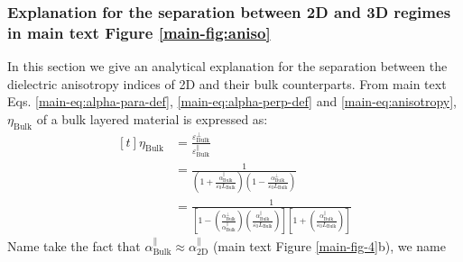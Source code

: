 \documentclass[manuscript=suppinfo,email=true,hyperref=true,keywords=false]{achemso}
\begin{document}
\subsubsection{Explanation for the separation between 2D and 3D regimes in main text Figure \ref{main-fig:aniso}}
\label{sssec:aniso-2}
In this section we give an analytical explanation for the separation
between the dielectric anisotropy indices of 2D and their bulk
counterparts. From main text Eqs. \ref{main-eq:alpha-para-def},
\ref{main-eq:alpha-perp-def} and \ref{main-eq:anisotropy},
$\eta_{\mathrm{Bulk}}$ of a bulk layered material is expressed as:
\begin{equation}
  \label{eq:eta-bulk}
  \begin{aligned}[t]
    \eta_{\mathrm{Bulk}} &= \frac{\varepsilon_{\mathrm{Bulk}}^{\perp}}
    {\varepsilon_{\mathrm{Bulk}}^{\parallel}}\\
    &= \frac{1}{\left(1 + {\displaystyle
          \frac{\alpha_{\mathrm{Bulk}}^{\parallel}}{\varepsilon_{0}L_{\mathrm{Bulk}}}}\right)
      \left(1 - {\displaystyle \frac{\alpha_{\mathrm{Bulk}}^{\perp}}{\varepsilon_{0}L_{\mathrm{Bulk}}}} \right)}\\
    &= \frac{1}{ \left[1-\left( {\displaystyle
            \frac{\alpha_{\mathrm{Bulk}}^{\perp}}{\alpha_{\mathrm{Bulk}}^{\parallel}}}\right)
        \left(
          {\displaystyle \frac{\alpha_{\mathrm{Bulk}}^{\parallel}}{\varepsilon_{0}
            L_{\mathrm{Bulk}}}} \right) \right]
      \left[ 1 + \left(
          {\displaystyle \frac{\alpha_{\mathrm{Bulk}}^{\parallel}}{\varepsilon_{0}
            L_{\mathrm{Bulk}}}} \right)\right]
    }
  \end{aligned}
\end{equation}
Name take the fact that
$\alpha_{\mathrm{Bulk}}^{\parallel} \approx
\alpha^{\parallel}_{\mathrm{2D}}$ (main text Figure
\ref{main-fig-4}b), we name
\end{document}
